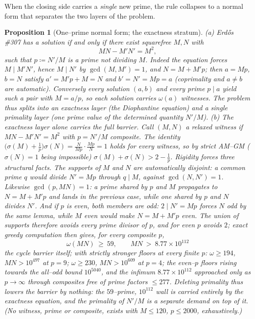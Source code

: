 \documentclass[11pt]{article}
\newtheorem{proposition}[theorem]{Proposition}
\theoremstyle{definition}
\begin{document}
When the closing side carries a \emph{single} new prime, the rule collapses to a normal form that
separates the two layers of the problem.

\begin{proposition}[One--prime normal form; the exactness stratum]\label{prop:oneprime}
\textup{(a)} Erd\H{o}s \#307 has a solution if and only if there exist squarefree $M,N$ with
\[ MN-M'N'=M^2, \]
such that $p\coloneqq N'/M$ is a prime not dividing $M$. Indeed the equation forces $M\mid M'N'$, hence
$M\mid N'$ by $\gcd(M,M')=1$, and $N=M+M'p$; then $a=Mp$, $b=N$ satisfy $a'=M'p+M=N$ and $b'=N'=Mp=a$
(coprimality and $a\ne b$ are automatic). Conversely every solution $(a,b)$ and every prime $p\mid a$
yield such a pair with $M=a/p$, so each solution carries $\omega(a)$ witnesses. The problem thus splits
into an \emph{exactness} layer (the Diophantine equation) and a single \emph{primality} layer (one prime
value of the determined quantity $N'/M$).
\textup{(b)} \emph{The exactness layer alone carries the full barrier.} Call $(M,N)$ a \emph{relaxed
witness} if $MN-M'N'=M^2$ with $p=N'/M$ composite. The identity
$\bigl(\sigma(M)+\tfrac1p\bigr)\sigma(N)=\frac{N}{Mp}\cdot\frac{Mp}{N}=1$ holds for \emph{every} witness,
so by strict AM--GM ($\sigma(N)=1$ being impossible) $\sigma(M)+\sigma(N)>2-\tfrac1p$. Rigidity forces
three structural facts. The supports of $M$ and $N$ are \emph{automatically} disjoint: a common prime
$q$ would divide $N'=Mp$ through $q\mid M$, against $\gcd(N,N')=1$. Likewise $\gcd(p,MN)=1$: a prime
shared by $p$ and $M$ propagates to $N=M+M'p$ and lands in the previous case, while one shared by $p$
and $N$ divides $N'$. And if $p$ is even, both members are odd: $2\mid N'=Mp$ forces $N$ odd by the same
lemma, while $M$ even would make $N=M+M'p$ even. The union of supports therefore avoids every prime
divisor of $p$, and for even $p$ avoids $2$; exact greedy computation then gives, for \emph{every}
composite $p$,
\[ \omega(MN)\ \ge\ 59, \qquad MN\ >\ 8.77\times10^{112} \]
the cycle barrier itself; with strictly stronger floors at every finite $p$: $\omega\ge194$,
$MN>10^{497}$ at $p=9$; $\omega\ge230$, $MN>10^{609}$ at $p=4$; the even--$p$ floors rising towards the
all--odd bound $10^{5040}$, and the infimum $8.77\times10^{112}$ approached only as $p\to\infty$ through
composites free of prime factors $\le277$. Deleting primality thus lowers the barrier by
\emph{nothing}: the $59$--prime, $10^{112}$ wall is carried entirely by the exactness equation, and the
primality of $N'/M$ is a separate demand on top of it. (No witness, prime or composite, exists with
$M\le120$, $p\le2000$, exhaustively.)
\end{proposition}
\end{document}
